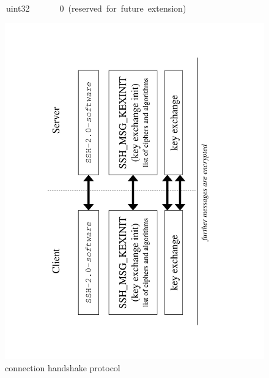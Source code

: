 \begin{enumerate}
\begin{lyxcode}
~~~~~~uint32~~~~~~~0~(reserved~for~future~extension)
\end{lyxcode}
%
\begin{figure}
\begin{centering}
\includegraphics[clip,scale=0.4,angle=270]{ssh_init}
\par\end{centering}

\caption{\label{fig:ssh-init} connection handshake protocol}

\end{figure}



\end{enumerate}
